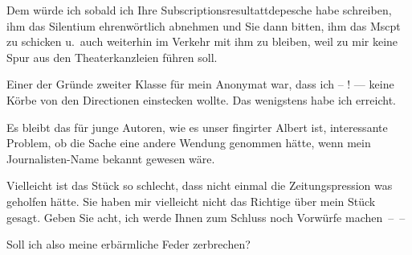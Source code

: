 \pstart
           Dem würde ich
                  sobald ich Ihre Subscriptionsresultattdepesche habe schreiben, ihm das Silentium
                  ehrenwörtlich abnehmen und Sie dann bitten, ihm das Mscpt zu schicken u. auch weiterhin im Verkehr mit ihm zu bleiben, weil
                  zu mir keine Spur aus den Theaterkanzleien führen soll.\pend
           
\pstart
           Einer der Gründe zweiter
                  Klasse für mein Anonymat war, dass {\pb}ich – \label{K_L03849-2v}\label{K_L03849-2}! — keine Körbe von
                  den Directionen einstecken wollte. Das wenigstens habe ich erreicht.\pend
           
\pstart
           Es bleibt das
                  für junge Autoren, wie es unser fingirter Albert ist, interessante Problem, ob die
                  Sache eine andere Wendung genommen hätte, wenn mein Journalisten-Name bekannt
                  gewesen wäre.\pend
           
\pstart
           Vielleicht ist das Stück so schlecht,
                  dass nicht einmal die Zeitungspression was geholfen hätte. Sie haben mir
                  vielleicht nicht das Richtige über mein Stück gesagt.
                  Geben Sie acht, ich werde Ihnen zum Schluss noch Vorwürfe machen – –\pend
           
\pstart
           Soll ich also
                  meine erbärmliche Feder zerbrechen?\pend
           
